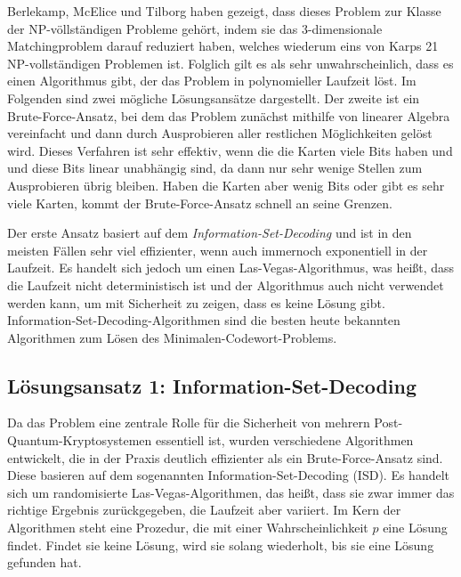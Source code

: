 \documentclass[a4paper,10pt,ngerman]{scrartcl}
\begin{document}
Berlekamp, McElice und Tilborg \cite{berlekampInherentIntractabilityCertain1978} haben gezeigt, dass dieses Problem zur Klasse der NP-völlständigen Probleme gehört, indem sie das 3-dimensionale Matchingproblem darauf reduziert haben, welches wiederum eins von Karps 21 NP-vollständigen Problemen ist.
Folglich gilt es als sehr unwahrscheinlich, dass es einen Algorithmus gibt, der das Problem in polynomieller Laufzeit löst. 
Im Folgenden sind zwei mögliche Lösungsansätze dargestellt. 
Der zweite ist ein Brute-Force-Ansatz, bei dem das Problem zunächst mithilfe von linearer Algebra vereinfacht und dann durch Ausprobieren aller restlichen Möglichkeiten gelöst wird.
Dieses Verfahren ist sehr effektiv, wenn die die Karten viele Bits haben und und diese Bits linear unabhängig sind, da dann nur sehr wenige Stellen zum Ausprobieren übrig bleiben. Haben die Karten aber wenig Bits oder gibt es sehr viele Karten, kommt der Brute-Force-Ansatz schnell an seine Grenzen.

Der erste Ansatz basiert auf dem \textit{Information-Set-Decoding} und ist in den meisten Fällen sehr viel effizienter, wenn auch immernoch exponentiell in der Laufzeit. Es handelt sich jedoch um einen Las-Vegas-Algorithmus, was heißt, dass die Laufzeit nicht deterministisch ist und der Algorithmus auch nicht verwendet werden kann, um mit Sicherheit zu zeigen, dass es keine Lösung gibt. 
Information-Set-Decoding-Algorithmen sind die besten heute bekannten Algorithmen zum Lösen des Minimalen-Codewort-Problems.

\subsection{Lösungsansatz 1: Information-Set-Decoding}
Da das Problem eine zentrale Rolle für die Sicherheit von mehrern Post-Quantum-Kryptosystemen essentiell ist, wurden verschiedene Algorithmen entwickelt, die in der Praxis deutlich effizienter als ein Brute-Force-Ansatz sind. 
Diese basieren auf dem sogenannten Information-Set-Decoding (ISD). 
Es handelt sich um randomisierte Las-Vegas-Algorithmen, das heißt, dass sie zwar immer das richtige Ergebnis zurückgegeben, die Laufzeit aber variiert. 
Im Kern der Algorithmen steht eine Prozedur, die mit einer Wahrscheinlichkeit $p$ eine Lösung findet. Findet sie keine Lösung, wird sie solang wiederholt, bis sie eine Lösung gefunden hat. 
\end{document}
